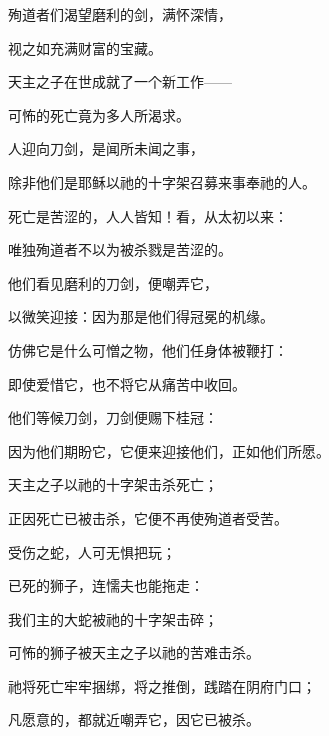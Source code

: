 殉道者们渴望磨利的剑，满怀深情，\par

视之如充满财富的宝藏。\par

天主之子在世成就了一个新工作——\par

可怖的死亡竟为多人所渴求。\par

人迎向刀剑，是闻所未闻之事，\par

除非他们是耶稣以祂的十字架召募来事奉祂的人。\par

死亡是苦涩的，人人皆知！看，从太初以来：\par

唯独殉道者不以为被杀戮是苦涩的。\par

他们看见磨利的刀剑，便嘲弄它，\par

以微笑迎接：因为那是他们得冠冕的机缘。\par

仿佛它是什么可憎之物，他们任身体被鞭打：\par

即使爱惜它，也不将它从痛苦中收回。\par

他们等候刀剑，刀剑便赐下桂冠：\par

因为他们期盼它，它便来迎接他们，正如他们所愿。\par

天主之子以祂的十字架击杀死亡；\par

正因死亡已被击杀，它便不再使殉道者受苦。\par

受伤之蛇，人可无惧把玩；\par

已死的狮子，连懦夫也能拖走：\par

我们主的大蛇被祂的十字架击碎；\par

可怖的狮子被天主之子以祂的苦难击杀。\par

祂将死亡牢牢捆绑，将之推倒，践踏在阴府门口；\par

凡愿意的，都就近嘲弄它，因它已被杀。\par

